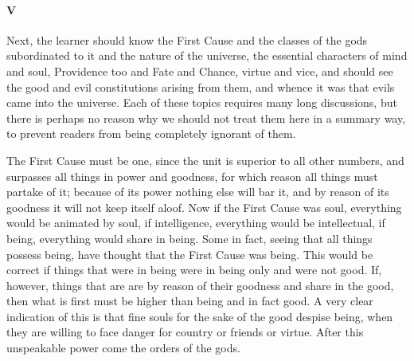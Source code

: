 \documentclass[12pt]{article}
\begin{document}
\paragraph{V} Next, the learner should know the First Cause and the
classes of the gods subordinated to it and the nature of the
universe, the essential characters of mind and soul, Providence
too and Fate and Chance, virtue and vice, and should
see the good and evil constitutions arising from them, and
whence it was that evils came into the universe. Each of
these topics requires many long discussions, but there is
perhaps no reason why we should not treat them here in a
summary way, to prevent readers from being completely
ignorant of them.

The First Cause must be one, since the unit is superior
to all other numbers, and surpasses all things in power and
goodness, for which reason all things must partake of it;
because of its power nothing else will bar it, and by reason
of its goodness it will not keep itself aloof. Now if the
First Cause was soul, everything would be animated by soul,
if intelligence, everything would be intellectual, if being,
everything would share in being. Some in fact, seeing that
all things possess being, have thought that the First Cause
was being. This would be correct if things that were in being
were in being only and were not good. If, however, things
that are are by reason of their goodness and share in the
good, then what is first must be higher than being and in
fact good. A very clear indication of this is that fine souls
for the sake of the good despise being, when they are willing
to face danger for country or friends or virtue. After this
unspeakable power come the orders of the gods.
\end{document}
